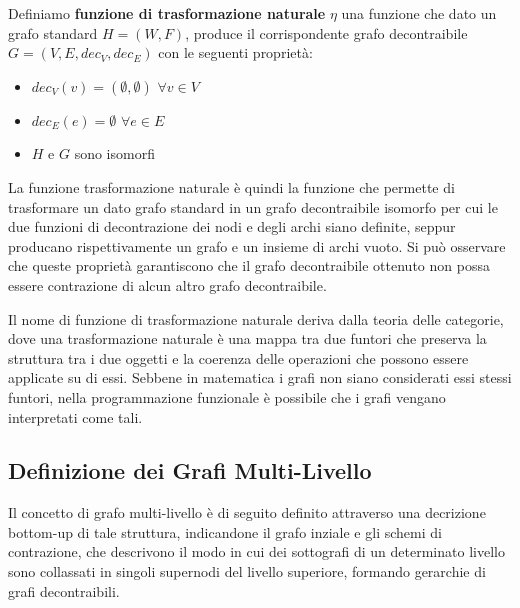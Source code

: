     \begin{definition}  \newline
    Definiamo \textbf{funzione di trasformazione naturale} $\eta$ una funzione che dato un grafo standard
        $H=(W,F)$, produce il corrispondente grafo decontraibile $G = (V, E, dec_V, dec_E)$ con le seguenti propriet\`a:
        \begin{itemize}
            \item $dec_V(v) = (\emptyset, \emptyset)$ \quad $\forall v\in V$
            \item $dec_E(e) = \emptyset$ \quad $\forall e\in E$
            \item $H$ e $G$ sono isomorfi
        \end{itemize}
    \end{definition}

    La funzione trasformazione naturale \`e quindi la funzione che permette di trasformare un dato grafo standard in un
    grafo decontraibile isomorfo per cui le due funzioni di decontrazione dei nodi e degli archi siano definite,
    seppur producano rispettivamente un grafo e un insieme di archi vuoto. \newline
    Si pu\`o osservare che queste propriet\`a garantiscono che il grafo decontraibile ottenuto non possa essere
    contrazione di alcun altro grafo decontraibile. \newline

    Il nome di funzione di trasformazione naturale deriva dalla teoria delle categorie, dove una trasformazione
    naturale \`e una mappa tra due funtori che preserva la struttura tra i due oggetti e la coerenza delle operazioni
    che possono essere applicate su di essi. Sebbene in matematica i grafi non siano considerati essi stessi funtori,
    nella programmazione funzionale \`e possibile che i grafi vengano interpretati come tali. \newline

    \subsection{Definizione dei Grafi Multi-Livello}\label{subsec:definzione-grafi_multilivello}

    Il concetto di grafo multi-livello \`e di seguito definito attraverso una decrizione bottom-up di tale struttura,
    indicandone il grafo inziale e gli schemi di contrazione, che descrivono il modo in cui dei sottografi di un
    determinato livello sono collassati in singoli supernodi del livello superiore, formando gerarchie di grafi
    decontraibili.

